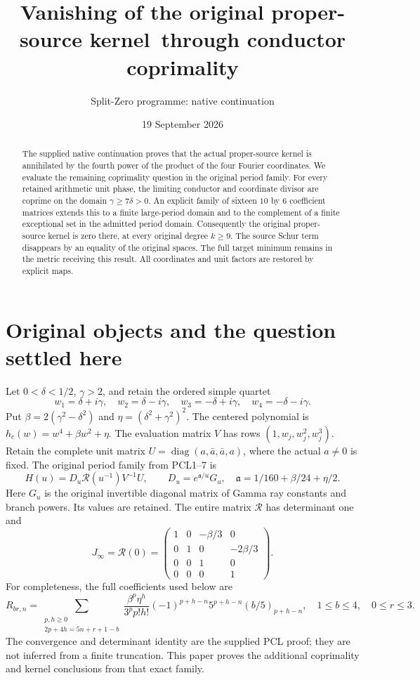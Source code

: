 \documentclass[11pt]{article}
\title{Vanishing of the original proper-source kernel\ through conductor coprimality}
\author{Split-Zero programme: native continuation}
\date{19 September 2026}
\newcommand{\diag}{\operatorname{diag}}
\begin{document}
\maketitle
\begin{abstract}
The supplied native continuation proves that the actual proper-source
kernel is annihilated by the fourth power of the product of the four
Fourier coordinates. We evaluate the remaining coprimality question in
the original period family. For every retained arithmetic unit phase,
the limiting conductor and coordinate divisor are coprime on the domain
$\gamma\ge7\delta>0$. An explicit family of sixteen $10$ by $6$
coefficient matrices extends this to a finite large-period domain and
to the complement of a finite exceptional set in the admitted period
domain. Consequently the original proper-source kernel is zero there,
at every original degree $k\ge9$. The source Schur term disappears by
an equality of the original spaces. The full target minimum remains in
the metric receiving this result. All coordinates and unit factors are
restored by explicit maps.
\end{abstract}

\section{Original objects and the question settled here}
Let $0<\delta<1/2$, $\gamma>2$, and retain the ordered simple quartet
\[
 w_1=\delta+i\gamma,\quad w_2=\delta-i\gamma,
 \quad w_3=-\delta+i\gamma,\quad w_4=-\delta-i\gamma.
 \tag{NC1}
\]
Put $\beta=2(\gamma^2-\delta^2)$ and
$\eta=(\delta^2+\gamma^2)^2$. The centered polynomial is
$h_c(w)=w^4+\beta w^2+\eta$. The evaluation matrix $V$ has rows
$(1,w_j,w_j^2,w_j^3)$. Retain the complete unit matrix
$U=\diag(a,\bar a,\bar a,a)$, where the actual $a\ne0$ is fixed.
The original period family from PCL1--7 \cite{PCL} is
\[
 H(u)=D_u\mathcal R(u^{-1})V^{-1}U,
 \qquad D_u=e^{\mathfrak a/u}G_u,
 \quad\mathfrak a=1/160+\beta/24+\eta/2. \tag{NC2}
\]
Here $G_u$ is the original invertible diagonal matrix of Gamma ray
constants and branch powers. Its values are retained. The entire matrix
$\mathcal R$ has determinant one and
\[
 J_\infty=\mathcal R(0)=
 \begin{pmatrix}1&0&-\beta/3&0\\0&1&0&-2\beta/3\\
 0&0&1&0\\0&0&0&1\end{pmatrix}. \tag{NC3}
\]
For completeness, the full coefficients used below are
\[
 R_{br,n}=\sum_{\substack{p,h\ge0\\2p+4h=5n+r+1-b}}
 \frac{\beta^p\eta^h}{3^p p!h!}(-1)^{p+h-n}
 5^{p+h-n}(b/5)_{p+h-n},
 \quad1\le b\le4,\quad0\le r\le3. \tag{NC4}
\]
The convergence and determinant identity are the supplied PCL proof;
they are not inferred from a finite truncation. This paper proves the
additional coprimality and kernel conclusions from that exact family.
\end{document}
